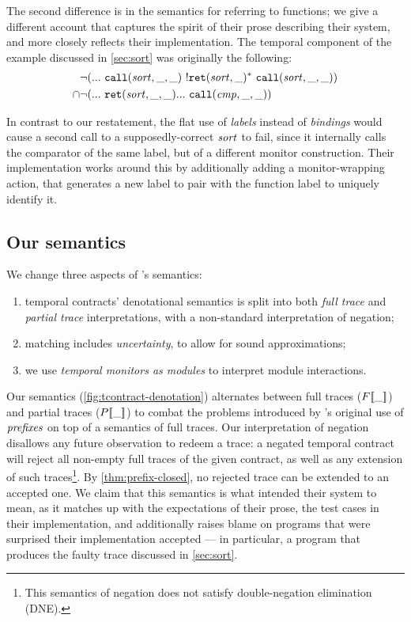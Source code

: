 The second difference is in the semantics for referring to functions; we give a different account that captures the spirit of their prose describing their system, and more closely reflects their implementation.
%
The temporal component of the example discussed in \autoref{sec:sort} was originally the following:
\begin{align*}
 &\neg ({\tt ...}~ {\tt call}(\mathit{sort},\_,\_)~ {}! {\tt ret}(\mathit{sort},\_)^*~ {\tt call}(\mathit{sort},\_,\_))
 \\ \cap& \neg ({\tt ...}~ {\tt ret}(\mathit{sort},\_,\_) {\tt ...}~ {\tt call}(\mathit{cmp},\_,\_))
\end{align*}

In contrast to our restatement, the flat use of \emph{labels} instead of \emph{bindings} would cause a second call to a supposedly-correct $\mathit{sort}$ to fail, since it internally calls the comparator of the same label, but of a different monitor construction.
%
Their implementation works around this by additionally adding a monitor-wrapping action, that generates a new label to pair with the function label to uniquely identify it.

\subsection{Our semantics}
%
We change three aspects of \dfm's semantics:
\begin{enumerate}
  \item{temporal contracts' denotational semantics is split into both \emph{full trace} and \emph{partial trace} interpretations, with a non-standard interpretation of negation;}
  \item{matching includes \emph{uncertainty}, to allow for sound approximations;}
  \item{we use \emph{temporal monitors as modules} to interpret module interactions.}
\end{enumerate}
%

%
Our semantics (\autoref{fig:tcontract-denotation}) alternates between full traces ($F[\![ \_ ]\!]$) and partial traces ($P[\![ \_ ]\!]$) to combat the problems introduced by \dfm's original use of $\mathit{prefixes}$ on top of a semantics of full traces.
%
Our interpretation of negation disallows any future observation to redeem a trace: a negated temporal contract will reject all non-empty full traces of the given contract, as well as any extension of such traces\footnote{This semantics of negation does not satisfy double-negation elimination (DNE).}.
%
By \autoref{thm:prefix-closed}, no rejected trace can be extended to an accepted one.
%
We claim that this semantics is what \dfm{} intended their system to mean, as it matches up with the expectations of their prose, the test cases in their implementation, and additionally raises blame on programs that \dfm{} were surprised their implementation accepted --- in particular, a program that produces the faulty trace discussed in \autoref{sec:sort}.
%


